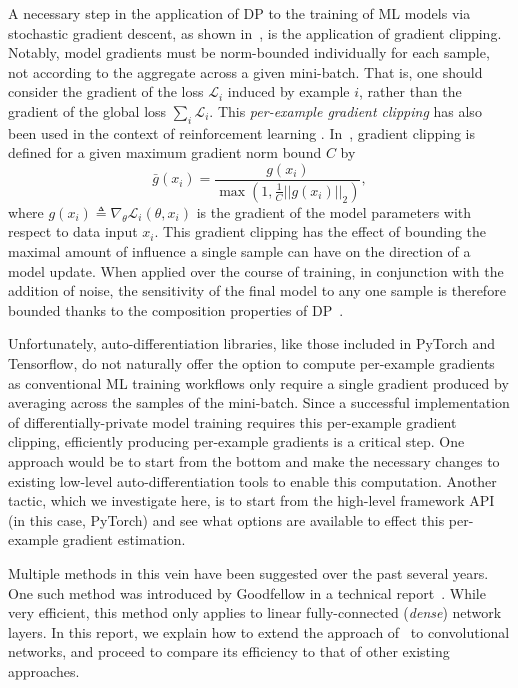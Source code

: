 \documentclass[11pt]{article}
\begin{document}
A necessary step in the application of DP to the training of ML models via
stochastic gradient descent, as shown in~\cite{abadi2016deep}, is the
application of gradient clipping. Notably, model gradients must be
norm-bounded individually for each sample, not according to the aggregate
across a given mini-batch.  That is, one should consider the gradient of the
loss $\mathcal L_i$ induced by example $i$, rather than the gradient of the
global loss $\sum_i \mathcal L_i$.  This \emph{per-example gradient
clipping} has also been used in the context of reinforcement learning
\cite{wang2016dueling}. In~\cite{abadi2016deep}, gradient clipping is
defined for a given maximum gradient norm bound $C$ by
%
\begin{equation}
    \bar{g}(x_i) = \frac{g(x_i)}{\max \left(1, \frac{1}{C} ||g(x_i) ||_2 \right)},
    \label{eq:gradclip}
\end{equation}
%
where $g(x_i) \triangleq \nabla_{\theta} \mathcal{L}_i(\theta, x_i)$ is the
gradient of the model parameters with respect to data input $x_i$. This
gradient clipping has the effect of bounding the maximal amount of influence
a single sample can have on the direction of a model update. When applied over
the course of training, in conjunction with the addition of noise, the
sensitivity of the final model to any one sample is therefore bounded thanks
to the composition properties of DP~\cite{abadi2016deep}.

Unfortunately, auto-differentiation libraries, like those included in
PyTorch and Tensorflow, do not naturally offer the option to compute
per-example gradients as conventional ML training workflows only require
a single gradient produced by averaging across the samples of the
mini-batch. Since a successful implementation of differentially-private
model training requires this per-example gradient clipping, efficiently
producing per-example gradients is a critical step. One approach would be to
start from the bottom and make the necessary changes to existing low-level
auto-differentiation tools to enable this computation.  Another tactic,
which we investigate here, is to start from the high-level framework API (in
this case, PyTorch) and see what options are available to effect this
per-example gradient estimation.

Multiple methods in this vein have been suggested over the past several
years.  One such method was introduced by Goodfellow in a technical
report~\cite{goodfellow2015efficient}.  While very efficient, this method
only applies to linear fully-connected (\emph{dense}) network layers.  In
this report, we explain how to extend the approach
of~\cite{goodfellow2015efficient} to convolutional networks, and proceed to
compare its efficiency to that of other existing approaches.
\end{document}
